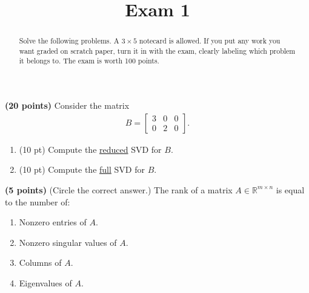 \documentclass{ximera}
\begin{document}
\title{Exam 1}

\begin{abstract}
Solve the following problems. A $3\times 5$ notecard is allowed. If you put any work you want graded on scratch paper, turn it in with the exam, clearly labeling which problem it belongs to. The exam is worth 100 points.
\end{abstract}
\maketitle

\begin{exercise}
\textbf{(20 points)} Consider the matrix
\begin{align*}
    B = \begin{bmatrix}
            3 & 0 & 0 \\ 0 & 2 & 0
        \end{bmatrix}.
\end{align*}
\begin{enumerate}
    \item (10 pt) Compute the \underline{reduced} SVD for $B$.
    \vfill
    \item (10 pt) Compute the \underline{full} SVD for $B$.
    \vfill
\end{enumerate}
\end{exercise}

\newpage

\begin{exercise}
\textbf{(5 points)} (Circle the correct answer.) The rank of a matrix $A \in \mathbb{R}^{m \times n}$
is equal to the number of:
\begin{enumerate}
    \item Nonzero entries of $A$.
    \item Nonzero singular values of $A$.
    \item Columns of $A$.
    \item Eigenvalues of $A$.
\end{enumerate}
\end{exercise}
\end{document}
